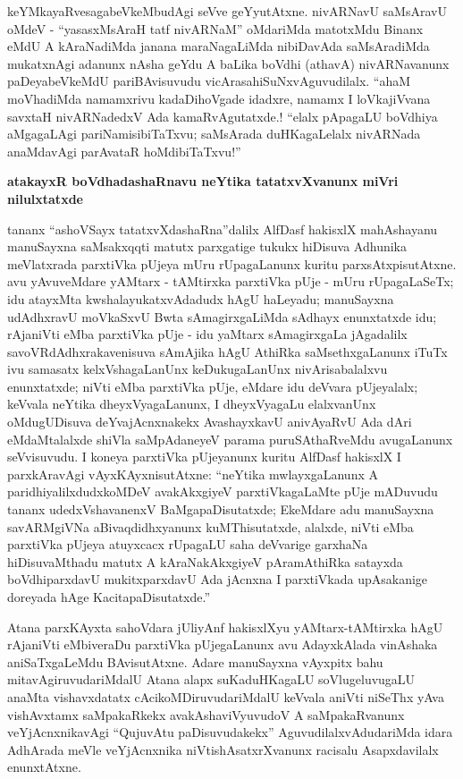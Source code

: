 keYMkayaRvesagabeVkeMbudAgi seVve geYyutAtxne. nivARNavU saMsAravU oMdeV - ``yasasxMsAraH tatf \hbox{nivARNaM}'' oMdariMda matotxMdu Binanx eMdU A kAraNadiMda janana maraNagaLiMda nibiDavAda saMsAradiMda mukatxnAgi adanunx nAsha geYdu A baLika boVdhi (athavA) nivARNavanunx paDeyabeVkeMdU pariBAvisuvudu vicArasahiSuNxvAguvudilalx. ``ahaM moVhadiMda namamxrivu kadaDihoVgade idadxre, namamx I loVkajiVvana savxtaH nivARNadedxV Ada kamaR\-vAgutatxde.! ``elalx pApagaLU boVdhiya aMgagaLAgi pariNamisibiTaTxvu; saMsArada duHKagaLelalx nivARNada anaMdavAgi parAvataR hoMdibiTaTxvu!''

\smallskip
\begin{center}
{\Large\bf atakayxR boVdhadashaRnavu neYtika tatatxvXvanunx miVri nilulxtatxde}
\end{center}

tananx ``ashoVSayx tatatxvXdashaRna''dalilx AlfDasf hakisxlX mahAshayanu manuSayxna saMsakxqqti matutx parxgatige tukukx hiDisuva Adhunika meVlatxrada parxtiVka pUjeya mUru rUpagaLanunx kuritu parxsAtxpisutAtxne. avu yAvuveMdare  yAMtarx - tAMtirxka parxtiVka pUje - mUru rUpagaLaSeTx; idu atayxMta kwshalayukatxvAdadudx hAgU haLeyadu; manuSayxna udAdhxravU moVkaSxvU Bwta sAmagirxgaLiMda sAdhayx enunxtatxde idu;  rAjaniVti eMba parxtiVka pUje - idu yaMtarx sAmagirxgaLa jAgadalilx savoVRdAdhxrakavenisuva sAmAjika hAgU AthiRka saMsethxgaLanunx iTuTx ivu samasatx kelxVshagaLanUnx keDukugaLanUnx nivArisabalalxvu enunxtatxde;  niVti eMba parxtiVka pUje, eMdare idu deVvara pUjeyalalx; keVvala neYtika dheyxVyagaLanunx, I dheyxVyagaLu elalxvanUnx oMdugUDisuva deYvajAcnxnakekx AvashayxkavU anivAyaRvU Ada dAri eMdaMtalalxde shiVla saMpAdaneyeV parama puruSAthaRveMdu avugaLanunx seVvisuvudu. I koneya parxtiVka pUjeyanunx kuritu AlfDasf hakisxlX I parxkAravAgi vAyxKAyxnisutAtxne: ``neYtika mwlayxgaLanunx A paridhiyalilxdudxkoMDeV avakAkxgiyeV parxtiVkagaLaMte pUje mADuvudu tananx udedxVshavanenxV BaMgapaDisutatxde; EkeMdare adu manuSayxna savARMgiVNa aBivaqdidhxyanunx kuMThisutatxde, alalxde, niVti eMba parxtiVka pUjeya atuyxcacx rUpagaLU saha deVvarige garxhaNa hiDisuvaMthadu matutx A kAraNakAkxgiyeV pAramAthiRka satayxda boVdhiparxdavU mukitxparxdavU Ada jAcnxna I parxtiVkada upAsakanige doreyada hAge KacitapaDisutatxde.''

Atana parxKAyxta sahoVdara jUliyAnf hakisxlXyu yAMtarx-tAMtirxka hAgU rAjaniVti eMbiveraDu parxtiVka pUjegaLanunx avu AdayxkAlada vinAshaka aniSaTxgaLeMdu BAvisutAtxne. Adare manuSayxna vAyxpitx bahu mitavAgiruvudariMdalU Atana alapx suKaduHKagaLU soVlugeluvugaLU anaMta vishavxdatatx cAcikoMDiruvudariMdalU keVvala aniVti niSeThx yAva vishAvxtamx saMpakaRkekx avakAshaviVyuvudoV A saMpakaRvanunx veYjAcnxnikavAgi ``QujuvAtu paDisuvudakekx'' AguvudilalxvAdudariMda idara AdhArada meVle veYjAcnxnika niVtishAsatxrXvanunx racisalu Asapxdavilalx enunxtAtxne.

